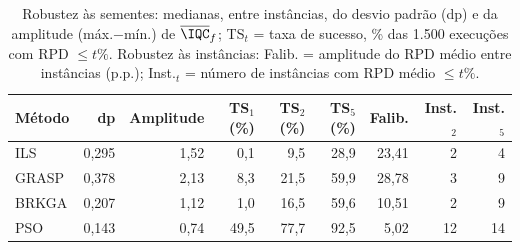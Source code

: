 \begin{table}[t]
\centering
\caption{Robustez às sementes: medianas, entre instâncias, do desvio padrão (dp) e da amplitude (máx.$-$mín.) de $\overline{\IQC}_f$; TS$_t$ = taxa de sucesso, \% das 1.500 execuções com RPD $\le t\%$. Robustez às instâncias: Falib. = amplitude do RPD médio entre instâncias (p.p.); Inst.$_t$ = número de instâncias com RPD médio $\le t\%$.}
\label{tab:robustness}
\footnotesize
\begin{tabular}{@{}lrrrrrrrr@{}}
\toprule
Método & dp & Amplitude & TS$_{1}$ (\%) & TS$_{2}$ (\%) & TS$_{5}$ (\%) & Falib. & Inst.$_{2}$ & Inst.$_{5}$ \\
\midrule
ILS & 0,295 & 1,52 & 0,1 & 9,5 & 28,9 & 23,41 & 2 & 4 \\
GRASP & 0,378 & 2,13 & 8,3 & 21,5 & 59,9 & 28,78 & 3 & 9 \\
BRKGA & 0,207 & 1,12 & 1,0 & 16,5 & 59,6 & 10,51 & 2 & 9 \\
PSO & 0,143 & 0,74 & 49,5 & 77,7 & 92,5 & 5,02 & 12 & 14 \\
\bottomrule
\end{tabular}
\end{table}
